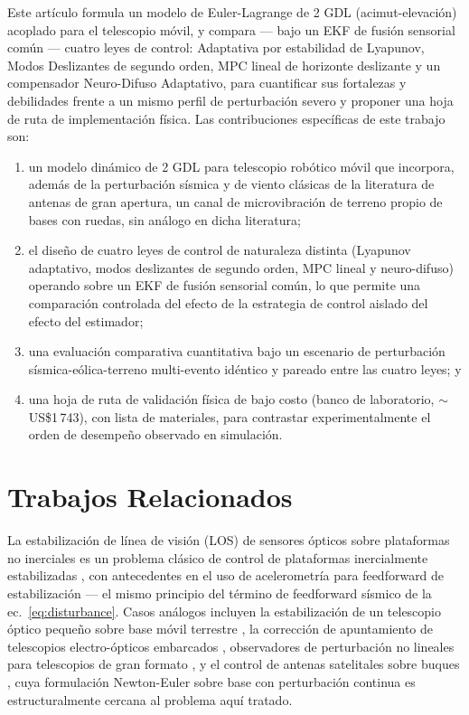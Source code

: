 \documentclass[journal]{IEEEtran}
\begin{document}
Este artículo formula un modelo de Euler-Lagrange de 2 GDL
(acimut-elevación) acoplado para el telescopio móvil, y compara --- bajo
un EKF de fusión sensorial común --- cuatro leyes de control: Adaptativa
por estabilidad de Lyapunov, Modos Deslizantes de segundo orden, MPC
lineal de horizonte deslizante y un compensador Neuro-Difuso Adaptativo,
para cuantificar sus fortalezas y debilidades frente a un mismo perfil de
perturbación severo y proponer una hoja de ruta de implementación física.
Las contribuciones específicas de este trabajo son:
\begingroup
\setlength{\itemsep}{0pt}\setlength{\topsep}{2pt}\setlength{\parskip}{0pt}
\begin{enumerate}
  \item un modelo dinámico de 2 GDL para telescopio robótico móvil que
  incorpora, además de la perturbación sísmica y de viento clásicas de la
  literatura de antenas de gran apertura, un canal de microvibración de
  terreno propio de bases con ruedas, sin análogo en dicha literatura;
  \item el diseño de cuatro leyes de control de naturaleza distinta
  (Lyapunov adaptativo, modos deslizantes de segundo orden, MPC lineal y
  neuro-difuso) operando sobre un EKF de fusión sensorial común, lo que
  permite una comparación controlada del efecto de la estrategia de
  control aislado del efecto del estimador;
  \item una evaluación comparativa cuantitativa bajo un escenario de
  perturbación sísmica-eólica-terreno multi-evento idéntico y pareado
  entre las cuatro leyes; y
  \item una hoja de ruta de validación física de bajo costo (banco de
  laboratorio, $\sim$US\$1\,743), con lista de materiales, para
  contrastar experimentalmente el orden de desempeño observado en
  simulación.
\end{enumerate}
\endgroup

\section{Trabajos Relacionados}

La estabilización de línea de visión (LOS) de sensores ópticos sobre
plataformas no inerciales es un problema clásico de control de
plataformas inercialmente estabilizadas
\cite{hilkert2008inertially}, con antecedentes en el
uso de acelerometría para feedforward de estabilización
\cite{algrain1993accelerometer} --- el mismo principio del término de
feedforward sísmico de la ec.~\ref{eq:disturbance}. Casos análogos incluyen la estabilización de un telescopio
óptico pequeño sobre base móvil terrestre \cite{hepworth2019twoaxis}, la
corrección de apuntamiento de telescopios electro-ópticos embarcados
\cite{he2023pointing}, observadores de perturbación no lineales para
telescopios de gran formato \cite{liu2023precise}, y el control de
antenas satelitales sobre buques \cite{soltani2011reliable,kuseyri2017modelling},
cuya formulación Newton-Euler sobre base con perturbación continua es
estructuralmente cercana al problema aquí tratado.
\end{document}
